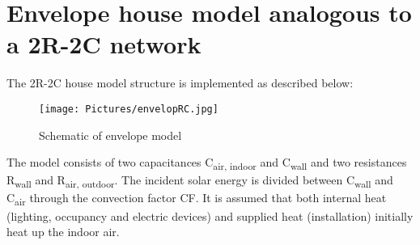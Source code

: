 \section{Envelope house model analogous to a 2R-2C network}

The 2R-2C house model structure is implemented as described below:
	
\begin{figure}[H]
	\centering
	\texttt{[image: Pictures/envelopRC.jpg]}
	\caption[Short title]{Schematic of envelope model}
	\label{fig:schematic2R2C}
	\end{figure} 
	
	
The model consists of two capacitances C\textsubscript{air, indoor} and C\textsubscript{wall} and two resistances R\textsubscript{wall} and R\textsubscript{air, outdoor}. The incident solar energy is divided between C\textsubscript{wall} and C\textsubscript{air} through the convection factor CF. It is assumed that both internal heat (lighting, occupancy and electric devices) and supplied heat (installation) initially heat up the indoor air. 

\newpage